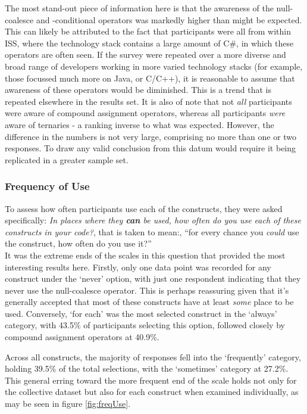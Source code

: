 \documentclass{article}
\begin{document}
            The most stand-out piece of information here is that the awareness of the null-coalesce and -conditional operators was markedly higher than might be expected. This can likely be attributed to the fact that participants were all from within ISS, where the  technology stack contains a large amount of C\#, in which these operators are often seen. If the survey were repeated over a more diverse and broad range of developers working in more varied technology stacks (for example, those focussed much more on Java, or C/C++), it is reasonable to assume that awareness of these operators would be diminished. This is a trend that is repeated elsewhere in the results set.
            It is also of note that not \emph{all} participants were aware of compound assignment operators, whereas all participants \emph{were} aware of ternaries - a ranking inverse to what was expected. However, the difference in the numbers is not very large, comprising no more than one or two responses. To draw any valid conclusion from this datum would require it being replicated in a greater sample set.
        \subsubsection{Frequency of Use}
            To assess how often participants use each of the constructs, they were asked specifically: \textit{In places where they \textbf{can} be used, how often do you use each of these constructs in your code?}, that is taken to mean:, ``for every chance you \emph{could} use the construct, how often do you use it?''
            \\\newline
            It was the extreme ends of the scales in this question that provided the most interesting results here. Firstly, only one data point was recorded for any construct under the `never' option, with just one respondent indicating that they never use the null-coalesce operator. This is perhaps reassuring given that it's generally accepted that most of these constructs have at least \emph{some} place to be used. Conversely, `for each' was the most selected construct in the `always' category, with 43.5\% of participants selecting this option, followed closely by compound assignment operators at 40.9\%.

            Across all constructs, the majority of responses fell into the `frequently' category, holding 39.5\% of the total selections, with the `sometimes' category at 27.2\%. This general erring toward the more frequent end of the scale holds not only for the collective dataset but also for each construct when examined individually, as may be seen in figure \ref{fig:freqUse}.
\end{document}
